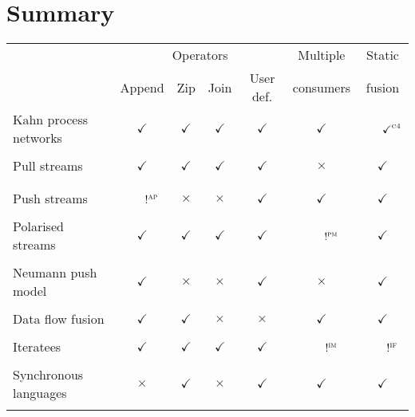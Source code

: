 \section{Summary}

\newcommand\Y{$\checkmark$}
\newcommand\N{$\times$}
\begin{table}
\begin{tabular}{l|cccccc}
 & \multicolumn{4}{c}{Operators} & Multiple & Static \\
 & Append & Zip & Join & User def. & consumers & fusion \\
\hline
Kahn process networks   & \Y & \Y & \Y & \Y & \Y & ~~~$\checkmark^{\textsc{c4}}$  \\
\\
Pull streams            & \Y & \Y & \Y & \Y & \N & \Y \\
\quad \citet{coutts2007stream} \\
\quad \citet{kiselyov2016stream} \\
Push streams            & ~~~$!^{\textsc{ap}}$ & \N & \N & \Y & \Y & \Y \\
\\
Polarised streams       & \Y & \Y & \Y & \Y & ~~~$!^{\textsc{pm}}$ & \Y \\
\quad \citet{bernardy2015duality} \\
Neumann push model      & \Y & \N & \N & \Y & \N & \Y \\
\quad \citet{biboudis2017expressive} \\
Data flow fusion        & \Y & \Y & \N & \N & \Y & \Y \\
\quad \citet{lippmeier2013data} \\
Iteratees        & \Y & \Y & \Y & \Y & ~~~$!^{\textsc{im}}$ & ~~~$!^{\textsc{if}}$ \\
\quad \citet{kiselyov2012iteratees} \\
Synchronous languages & \N & \Y & \N & \Y & \Y & \Y \\
\quad \citet{mandel2010lucy} \\
\end{tabular}


\end{table}
